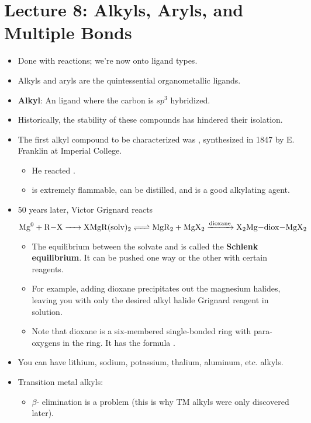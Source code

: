 \documentclass[../notes.tex]{subfiles}
\begin{document}
\section{Lecture 8: Alkyls, Aryls, and Multiple Bonds}
\begin{itemize}
    \item {}Done with reactions; we're now onto ligand types.
    \item Alkyls and aryls are the quintessential organometallic ligands.
    \item \textbf{Alkyl}: An  ligand where the carbon is $sp^3$ hybridized.
    \item Historically, the stability of these compounds has hindered their isolation.
    \item The first alkyl compound to be characterized was , synthesized in 1847 by E. Franklin at Imperial College.
    \begin{itemize}
        \item He reacted .
        \item {} is extremely flammable, can be distilled, and is a good alkylating agent.
    \end{itemize}
    \item 50 years later, Victor Grignard reacts
    \begin{equation*}
        \ce{Mg^0 + R-X -> XMgR({solv})2 <=> MgR2 + MgX2 ->[{dioxane}] X2Mg-{diox}-MgX2}
    \end{equation*}
    \begin{itemize}
        \item The equilibrium between the solvate and  is called the \textbf{Schlenk equilibrium}. It can be pushed one way or the other with certain reagents.
        \item For example, adding dioxane precipitates out the magnesium halides, leaving you with only the desired alkyl halide Grignard reagent in solution.
        \item Note that dioxane is a six-membered single-bonded ring with para-oxygens in the ring. It has the formula .
    \end{itemize}
    \item You can have lithium, sodium, potassium, thalium, aluminum, etc. alkyls.
    \item Transition metal alkyls:
    \begin{itemize}
        \item $\beta$- elimination is a problem (this is why TM alkyls were only discovered later).

\end{itemize}
\end{itemize}
\end{document}
